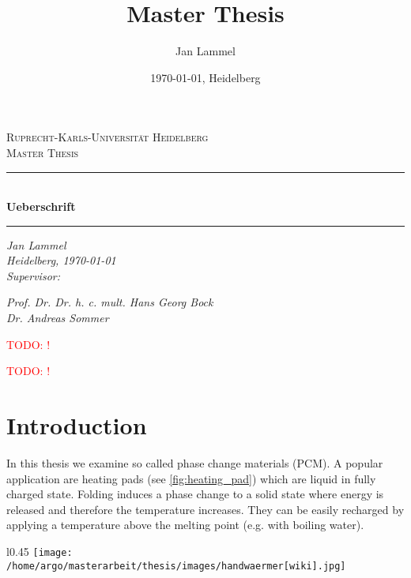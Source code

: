 \documentclass{scrartcl}[12pt, halfparskip]
\title{Master Thesis}
\author{Jan Lammel}
\date{\today{}, Heidelberg}
\numberwithin{equation}{section}
\numberwithin{figure}{section}
\numberwithin{table}{section}
\newcommand{\todo}[1]{\textcolor{red}{TODO: #1}}
\begin{document}
\begin{titlepage}
	\begin{center}
	
	\textsc{\large Ruprecht-Karls-Universit\"{a}t Heidelberg} \\[0.5cm]
	\textsc{\large Master Thesis}\\[1cm]
	
	\newcommand{\HRule}{\rule{\linewidth}{0.5mm}}
	\HRule \\[0.4cm]
	\huge \bfseries Ueberschrift
	\HRule 
	
	\vspace{11cm}
	
	\Large \textit{Jan Lammel }\\
	\Large \textit{Heidelberg, \today }\\ \vspace{0.5cm}
	\Large \textit{Supervisor:}
	
	\Large \textit{Prof. Dr. Dr. h. c. mult. Hans Georg Bock}\\
	\Large \textit{Dr. Andreas Sommer}
	
	\end{center}
\end{titlepage}

\newpage

\tableofcontents 
\newpage

 

 \todo{!}
 
 
 \newpage

\todo{!}

\newpage
{}

\section{Introduction}
In this thesis we examine so called phase change materials (PCM). A popular application are heating pads (see \cref{fig:heating_pad}) which are liquid in fully charged state. Folding induces a phase change to a solid state where energy is released and therefore the temperature increases. They can be easily recharged by applying a temperature above the melting point (e.g. with boiling water). 

\begin{wrapfigure}{l}{0.45\textwidth}
	\texttt{[image: /home/argo/masterarbeit/thesis/images/handwaermer[wiki].jpg]}
	\caption{Heating pad \\ left: liquid; right: solid \\
		Source: \cite{heating_pad_image}}
	\label{fig:heating_pad}
\end{wrapfigure}
\end{document}
